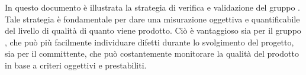 In questo documento è illustrata la strategia di verifica e validazione del gruppo \gruppo . Tale strategia è fondamentale per dare una misurazione oggettiva e quantificabile del livello di qualità di quanto viene prodotto. \newline
Ciò è vantaggioso sia per il gruppo \gruppo , che può più facilmente individuare difetti durante lo svolgimento del progetto, sia per il {committente}, che può costantemente monitorare la qualità del prodotto in base a criteri oggettivi e prestabiliti.
